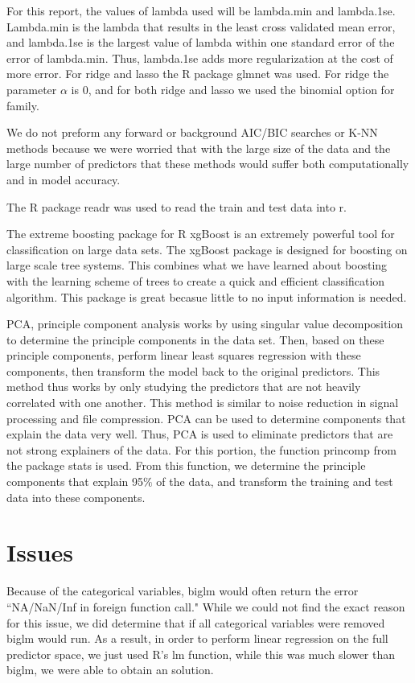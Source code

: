 \documentclass[aps, reprint, groupedaddress, superscriptaddress, amsmath, 10pt]{revtex4-1}
\begin{document}
	For this report, the values of lambda used will be lambda.min and lambda.1se.  Lambda.min is the lambda that results in the least cross validated mean error, and lambda.1se is the largest value of lambda within one standard error of the error of lambda.min.  Thus, lambda.1se adds more regularization at the cost of more error.  For ridge and lasso the R package glmnet was used.  For ridge the parameter $\alpha$ is 0, and for both ridge and lasso we used the binomial option for family.
	
	We do not preform any forward or background AIC/BIC searches or K-NN methods because we were worried that with the large size of the data and the large number of predictors that these methods would suffer both computationally and in model accuracy.
	
	The R package readr was used to read the train and test data into r.
	
	The extreme boosting package for R xgBoost is an extremely powerful tool for classification on large data sets. The xgBoost package is designed for boosting on large scale tree systems.  This combines what we have learned about boosting with the learning scheme of trees to create a quick and efficient classification algorithm.  This package is great becasue little to no input information is needed.
	
	PCA,  principle component analysis works by using singular value decomposition to determine the principle components in the data set.  Then, based on these principle components, perform linear least squares regression with these components, then transform the model back to the original predictors.  This method thus works by only studying the predictors that are not heavily correlated with one another.  This method is similar to noise reduction in signal processing and file compression.  PCA can be used to determine components that explain the data very well.  Thus, PCA is used to eliminate predictors that are not strong explainers of the data.  For this portion, the function princomp from the package stats is used.  From this function, we determine the principle components that explain 95$\%$ of the data, and transform the training and test data into these components.
	
	
	\section{Issues}
	Because of the categorical variables, biglm would often return the error ``NA/NaN/Inf in foreign function call."  While we could not find the exact reason for this issue, we did determine that if all categorical variables were removed biglm would run.  As a result, in order to perform linear regression on the full predictor space, we just used R's lm function, while this was much slower than biglm, we were able to obtain an solution.
\end{document}
